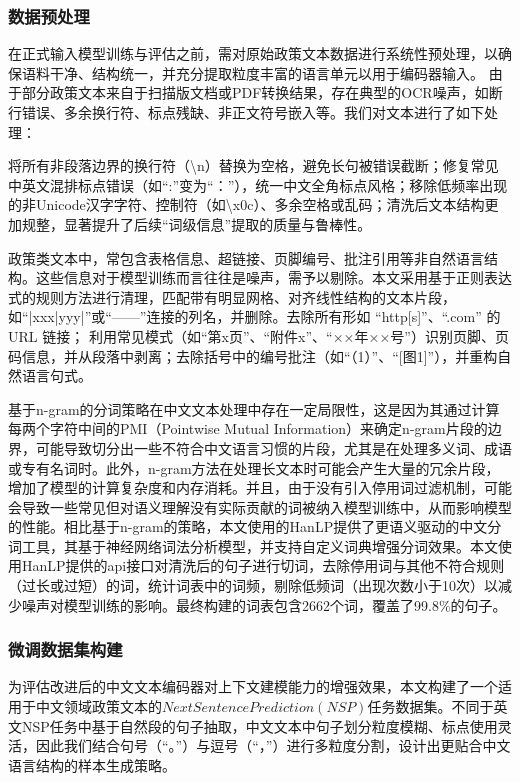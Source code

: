 \documentclass[12pt, a4paper]{ctexart}
\begin{document}
\subsubsection{数据预处理}
在正式输入模型训练与评估之前，需对原始政策文本数据进行系统性预处理，以确保语料干净、结构统一，并充分提取粒度丰富的语言单元以用于编码器输入。
由于部分政策文本来自于扫描版文档或PDF转换结果，存在典型的OCR噪声，如断行错误、多余换行符、标点残缺、非正文符号嵌入等。我们对文本进行了如下处理：

将所有非段落边界的换行符（\textbackslash n）替换为空格，避免长句被错误截断；修复常见中英文混排标点错误（如“:”变为“：”），统一中文全角标点风格；移除低频率出现的非Unicode汉字字符、控制符（如\textbackslash x0c）、多余空格或乱码；清洗后文本结构更加规整，显著提升了后续“词级信息”提取的质量与鲁棒性。

政策类文本中，常包含表格信息、超链接、页脚编号、批注引用等非自然语言结构。这些信息对于模型训练而言往往是噪声，需予以剔除。本文采用基于正则表达式的规则方法进行清理，匹配带有明显网格、对齐线性结构的文本片段，如“|xxx|yyy|”或“——”连接的列名，并删除。去除所有形如 “http[s]”、“.com” 的 URL 链接；
利用常见模式（如“第x页”、“附件x”、“××年××号”）识别页脚、页码信息，并从段落中剥离；去除括号中的编号批注（如“（1）”、“[图1]”），并重构自然语言句式。

基于n-gram的分词策略在中文文本处理中存在一定局限性，这是因为其通过计算每两个字符中间的PMI（Pointwise Mutual Information）来确定n-gram片段的边界，可能导致切分出一些不符合中文语言习惯的片段，尤其是在处理多义词、成语或专有名词时。此外，n-gram方法在处理长文本时可能会产生大量的冗余片段，增加了模型的计算复杂度和内存消耗。并且，由于没有引入停用词过滤机制，可能会导致一些常见但对语义理解没有实际贡献的词被纳入模型训练中，从而影响模型的性能。相比基于n-gram的策略，本文使用的HanLP提供了更语义驱动的中文分词工具，其基于神经网络词法分析模型，并支持自定义词典增强分词效果。本文使用HanLP提供的api接口对清洗后的句子进行切词，去除停用词与其他不符合规则（过长或过短）的词，统计词表中的词频，剔除低频词（出现次数小于10次）以减少噪声对模型训练的影响。最终构建的词表包含2662个词，覆盖了99.8\%的句子。

\subsubsection{微调数据集构建}
为评估改进后的中文文本编码器对上下文建模能力的增强效果，本文构建了一个适用于中文领域政策文本的$Next Sentence Prediction (NSP)$任务数据集。不同于英文NSP任务中基于自然段的句子抽取，中文文本中句子划分粒度模糊、标点使用灵活，因此我们结合句号（“。”）与逗号（“，”）进行多粒度分割，设计出更贴合中文语言结构的样本生成策略。
\end{document}
